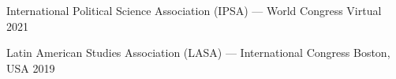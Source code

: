 
\begin{cvhonors}
\cvconf
{International Political Science Association (IPSA) --- World Congress} 
{Virtual}
{2021}
\end{cvhonors}

\begin{cvhonors}
\cvconf
{Latin American Studies Association (LASA) --- International Congress} 
{Boston, USA}
{2019}
\end{cvhonors}









